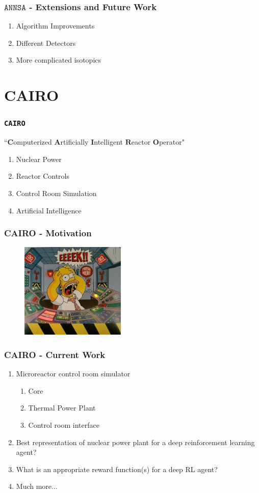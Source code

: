 	\begin{frame}
		\frametitle{$\texttt{ANNSA}$ - Extensions and Future Work}
		\begin{enumerate}
			\item Algorithm Improvements
			\item Different Detectors
			\item More complicated isotopics
		\end{enumerate}
	\end{frame}

	\section{CAIRO}

	\begin{frame}
		\frametitle{\texttt{CAIRO}}
		``$\textbf{C}$omputerized $\textbf{A}$rtificially $\textbf{I}$ntelligent $\textbf{R}$eactor $\textbf{O}$perator"\\
		\begin{enumerate}
			\item Nuclear Power
			\item Reactor Controls
			\item Control Room Simulation
			\item Artificial Intelligence
		\end{enumerate}
	\end{frame}

	\begin{frame}
		\frametitle{CAIRO - Motivation}
		\begin{figure}
			\includegraphics[width=5cm]{homer-reactor.jpg}
		\end{figure}
	\end{frame}
	\begin{frame}
		\frametitle{CAIRO - Current Work}
		\begin{enumerate}
			\item Microreactor control room simulator
			\begin{enumerate}
				\item Core
				\item Thermal Power Plant
				\item Control room interface
			\end{enumerate}
			\item Best representation of nuclear power plant for a deep reinforcement learning agent?
			\item What is an appropriate reward function(s) for a deep RL agent?
			\item Much more... 
		\end{enumerate}
	\end{frame}



% 